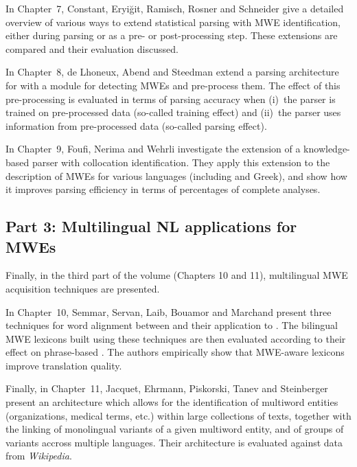 \begin{refsection}
In Chapter~7, {Constant, Eryiğit, Ramisch, Rosner and Schneider}
give a detailed overview of various ways to extend statistical parsing
with MWE identification, either during parsing or as a pre- or
post-processing step. These extensions are compared and their
evaluation discussed.

In Chapter~8, {de Lhoneux, Abend and Steedman} extend a 
parsing architecture for  with a module for detecting MWEs and
pre-process them. The effect of this pre-processing is evaluated in
terms of parsing accuracy when (i)~the parser is trained on
pre-processed data (so-called training effect) and (ii)~the parser
uses information from pre-processed data (so-called parsing effect).

In Chapter~9, {Foufi, Nerima and Wehrli} investigate the
extension of a knowledge-based parser with collocation
identification. They apply this extension to the description of MWEs
for various languages (including  and Greek), and show how it
improves parsing efficiency in terms of percentages of complete
analyses.

\subsection*{Part 3: Multilingual NL applications for MWEs}

Finally, in the third part of the volume (Chapters 10 and 11),
multilingual MWE acquisition techniques are presented.

In Chapter~10, {Semmar, Servan, Laib, Bouamor and Marchand}
present three techniques for word alignment between 
and their application to . The bilingual MWE
lexicons built using these techniques are then evaluated according to
their effect on phrase-based . The
authors empirically show that MWE-aware lexicons improve translation
quality.

Finally, in Chapter~11, {Jacquet, Ehrmann, Piskorski, Tanev and
  Steinberger} present an architecture which allows for the
identification of multiword entities (organizations, medical terms,
etc.) within large collections of texts, together with the linking of
monolingual variants of a given multiword entity, and of groups of
variants accross multiple languages. Their architecture is evaluated
against data from \textit{Wikipedia}.


\printbibliography[heading=subbibliography]
\end{refsection}

